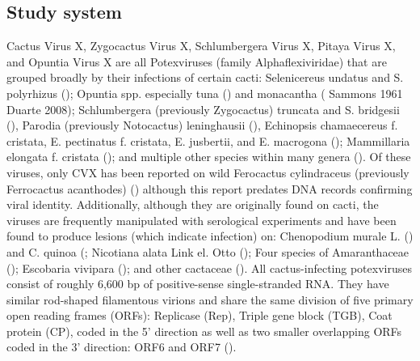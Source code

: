 \documentclass[11pt,letterpaper,titlepage]{article}
\begin{document}
\begin{linenumbers}

\subsection*{Study system}
Cactus Virus X, Zygocactus Virus X, Schlumbergera Virus X, Pitaya Virus X, and Opuntia Virus X are all Potexviruses (family Alphaflexiviridae) that are grouped broadly by their infections of certain cacti: Selenicereus undatus and S. polyrhizus (\cite{li_viral_2015, peng_molecular_2016}); Opuntia spp. especially tuna (\cite{koenig_molecular_2004, duarte_potexvirus_2008}) and monacantha (\cite{attathom_occurrence_1978} Sammons 1961 Duarte 2008); Schlumbergera (previously Zygocactus) truncata and S. bridgesii  (\cite{duarte_potexvirus_2008, koenig_molecular_2004}), Parodia (previously Notocactus) leninghausii (\cite{park_detection_2018}),  Echinopsis chamaecereus f. cristata, E. pectinatus f. cristata, E. jusbertii, and E. macrogona (\cite{maliarenko_cactus_2013}); Mammillaria elongata f. cristata (\cite{maliarenko_cactus_2013}); and multiple other species within many genera (\cite{evallo_brief_2021}). 
Of these viruses, only CVX has been reported on wild Ferocactus cylindraceus (previously Ferrocactus acanthodes) (\cite{attathom_occurrence_1978}) although this report predates DNA records confirming viral identity. 
Additionally, although they are originally found on cacti, the viruses are frequently manipulated with serological experiments and have been found to produce lesions (which indicate infection) on: Chenopodium murale L. (\cite{maliarenko_cactus_2013}) and C. quinoa (\cite{attathom_identification_1978,attathom_occurrence_1978, brandes_untersuchungen_1963-1}; Nicotiana alata Link el. Otto (\cite{maliarenko_cactus_2013}); Four species of Amaranthaceae (\cite{attathom_identification_1978}); Escobaria vivipara (\cite{attathom_identification_1978}); and other cactaceae (\cite{attathom_identification_1978}). 
All cactus-infecting potexviruses consist of roughly 6,600 bp of positive-sense single-stranded RNA. They have similar rod-shaped filamentous virions and share the same division of five primary open reading frames (ORFs): Replicase (Rep), Triple gene block (TGB), Coat protein (CP), coded in the 5' direction as well as two smaller overlapping ORFs coded in the 3' direction: ORF6 and ORF7 (\cite{evallo_brief_2021,liou_complete_2004, martelli_family_2007}). 

\end{linenumbers}
\end{document}
